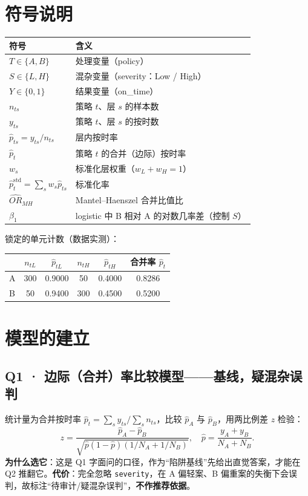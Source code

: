 \documentclass[12pt,a4paper]{ctexart}
\begin{document}
\section{符号说明}
\begin{center}
\begin{tabular}{ll}
\toprule
符号 & 含义 \\
\midrule
$T\in\{A,B\}$ & 处理变量（policy） \\
$S\in\{L,H\}$ & 混杂变量（severity：Low / High） \\
$Y\in\{0,1\}$ & 结果变量（on\_time） \\
$n_{ts}$ & 策略 $t$、层 $s$ 的样本数 \\
$y_{ts}$ & 策略 $t$、层 $s$ 的按时数 \\
$\hat p_{ts}=y_{ts}/n_{ts}$ & 层内按时率 \\
$\hat p_t$ & 策略 $t$ 的合并（边际）按时率 \\
$w_s$ & 标准化层权重（$w_L+w_H=1$） \\
$\hat p_t^{\text{std}}=\sum_s w_s\hat p_{ts}$ & 标准化率 \\
$\widehat{OR}_{MH}$ & Mantel--Haenszel 合并比值比 \\
$\beta_1$ & logistic 中 B 相对 A 的对数几率差（控制 $S$） \\
\bottomrule
\end{tabular}
\end{center}

锁定的单元计数（数据实测）：

\begin{center}
\begin{tabular}{lccccc}
\toprule
 & $n_{tL}$ & $\hat p_{tL}$ & $n_{tH}$ & $\hat p_{tH}$ & 合并率 $\hat p_t$ \\
\midrule
A & 300 & 0.9000 & 50 & 0.4000 & 0.8286 \\
B & 50 & 0.9400 & 300 & 0.4500 & 0.5200 \\
\bottomrule
\end{tabular}
\end{center}

\section{模型的建立}
\subsection{Q1 · 边际（合并）率比较模型——基线，疑混杂误判}
统计量为合并按时率 $\hat p_t=\sum_s y_{ts}/\sum_s n_{ts}$，比较 $\hat p_A$ 与 $\hat p_B$，用两比例差 $z$ 检验：
\[ z=\frac{\hat p_A-\hat p_B}{\sqrt{\hat p(1-\hat p)(1/N_A+1/N_B)}},\quad \hat p=\frac{y_A+y_B}{N_A+N_B}. \]
\textbf{为什么选它}：这是 Q1 字面问的口径，作为``陷阱基线''先给出直觉答案，才能在 Q2 推翻它。\textbf{代价}：完全忽略 \texttt{severity}，在 A 偏轻案、B 偏重案的失衡下会误判，故标注``待审计/疑混杂误判''，\textbf{不作推荐依据}。
\end{document}
